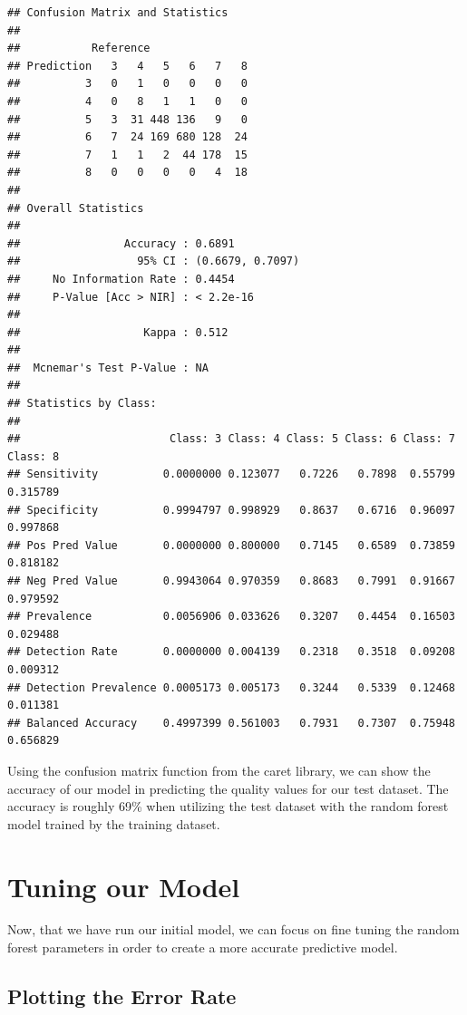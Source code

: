 \documentclass[
]{book}
\begin{document}
\begin{verbatim}
## Confusion Matrix and Statistics
## 
##           Reference
## Prediction   3   4   5   6   7   8
##          3   0   1   0   0   0   0
##          4   0   8   1   1   0   0
##          5   3  31 448 136   9   0
##          6   7  24 169 680 128  24
##          7   1   1   2  44 178  15
##          8   0   0   0   0   4  18
## 
## Overall Statistics
##                                           
##                Accuracy : 0.6891          
##                  95% CI : (0.6679, 0.7097)
##     No Information Rate : 0.4454          
##     P-Value [Acc > NIR] : < 2.2e-16       
##                                           
##                   Kappa : 0.512           
##                                           
##  Mcnemar's Test P-Value : NA              
## 
## Statistics by Class:
## 
##                       Class: 3 Class: 4 Class: 5 Class: 6 Class: 7 Class: 8
## Sensitivity          0.0000000 0.123077   0.7226   0.7898  0.55799 0.315789
## Specificity          0.9994797 0.998929   0.8637   0.6716  0.96097 0.997868
## Pos Pred Value       0.0000000 0.800000   0.7145   0.6589  0.73859 0.818182
## Neg Pred Value       0.9943064 0.970359   0.8683   0.7991  0.91667 0.979592
## Prevalence           0.0056906 0.033626   0.3207   0.4454  0.16503 0.029488
## Detection Rate       0.0000000 0.004139   0.2318   0.3518  0.09208 0.009312
## Detection Prevalence 0.0005173 0.005173   0.3244   0.5339  0.12468 0.011381
## Balanced Accuracy    0.4997399 0.561003   0.7931   0.7307  0.75948 0.656829
\end{verbatim}

Using the confusion matrix function from the caret library, we can show the accuracy of our model in predicting the quality values for our test dataset. The accuracy is roughly 69\% when utilizing the test dataset with the random forest model trained by the training dataset.

\hypertarget{tuning-our-model}{%
\section{Tuning our Model}\label{tuning-our-model}}

Now, that we have run our initial model, we can focus on fine tuning the random forest parameters in order to create a more accurate predictive model.

\hypertarget{plotting-the-error-rate}{%
\subsection{Plotting the Error Rate}\label{plotting-the-error-rate}}
\end{document}
